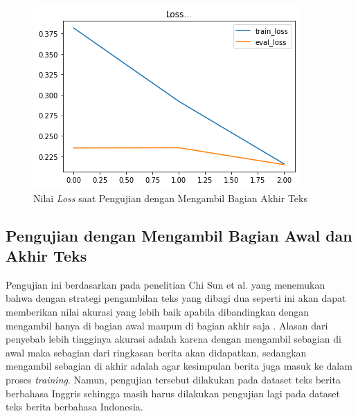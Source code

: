 \begin{figure}[h]
    \begin{center}
        \includegraphics[width= 0.9\linewidth]{gambar/loss_concat_akhir.png}
        \caption{Nilai \textit{Loss} saat Pengujian dengan Mengambil Bagian Akhir Teks}
        \label{fig: loss_const_akhir}
    \end{center}
\end{figure}

\subsection{Pengujian dengan Mengambil Bagian Awal dan Akhir Teks}

Pengujian ini berdasarkan pada penelitian Chi Sun et al. yang menemukan bahwa dengan strategi pengambilan teks yang dibagi dua seperti ini akan dapat memberikan nilai akurasi yang lebih baik apabila dibandingkan dengan mengambil hanya di bagian awal maupun di bagian akhir saja \cite{sun2019fine}. Alasan dari penyebab lebih tingginya akurasi adalah karena dengan mengambil sebagian di awal maka sebagian dari ringkasan berita akan didapatkan, sedangkan mengambil sebagian di akhir adalah agar kesimpulan berita juga masuk ke dalam proses \textit{training}. Namun, pengujian tersebut dilakukan pada dataset teks berita berbahasa Inggris sehingga masih harus dilakukan pengujian lagi pada dataset teks berita berbahasa Indonesia.

